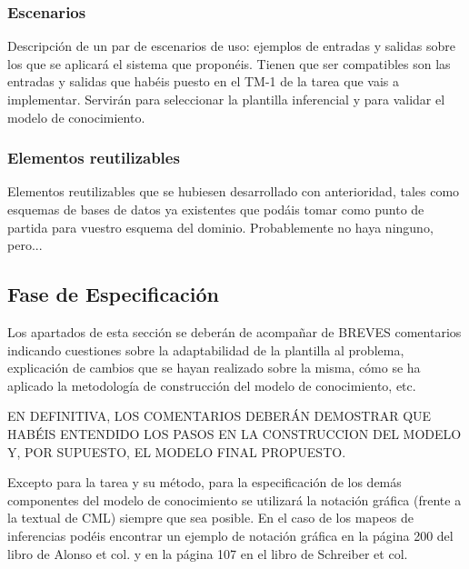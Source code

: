 \documentclass[12pt,a4paper,twoside,spanish]{article}      %
\begin{document}
\subsubsection{Escenarios}

Descripción de un par de escenarios de uso: ejemplos de entradas y salidas sobre los que se aplicará el sistema que proponéis. Tienen que ser compatibles son las entradas y salidas que habéis puesto en el TM-1 de la tarea que vais a implementar. Servirán para seleccionar la plantilla inferencial y para validar el modelo de conocimiento.

\subsubsection{Elementos reutilizables}

Elementos reutilizables que se hubiesen desarrollado con
anterioridad, tales como esquemas de bases de datos ya existentes que
podáis tomar como punto de partida para vuestro esquema del dominio.
Probablemente no haya ninguno, pero...


\subsection{Fase de Especificación}

Los apartados de esta sección  se deberán de acompañar de BREVES comentarios indicando
cuestiones sobre la adaptabilidad de la plantilla al problema,
explicación de cambios que se hayan realizado sobre la misma, cómo se ha
aplicado la metodología de construcción del modelo de conocimiento, etc.

EN DEFINITIVA, LOS COMENTARIOS DEBERÁN DEMOSTRAR QUE HABÉIS
ENTENDIDO LOS PASOS EN LA CONSTRUCCION DEL MODELO Y, POR
SUPUESTO, EL MODELO FINAL PROPUESTO.

Excepto para la tarea y su método, para la especificación de los demás
componentes del modelo de conocimiento se utilizará la notación gráfica
(frente a la textual de CML) siempre que sea posible. En el caso de los
mapeos de inferencias podéis encontrar un ejemplo de notación gráfica en
la página 200 del libro de Alonso et col. y en la página 107 en el libro de
Schreiber et col.
\end{document}

